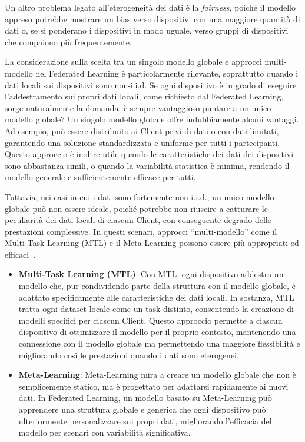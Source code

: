 \documentclass[a4paper, oneside, openright]{report}
\begin{document}
Un altro problema legato all'eterogeneità dei dati è la \textit{fairness}, poiché il modello appreso potrebbe mostrare un bias verso dispositivi con una maggiore quantità di dati o, se si ponderano i dispositivi in modo uguale, verso gruppi di dispositivi che compaiono più frequentemente.

La considerazione sulla scelta tra un singolo modello globale e approcci multi-modello nel Federated Learning è particolarmente rilevante, soprattutto quando i dati locali sui dispositivi sono non-i.i.d. Se ogni dispositivo è in grado di eseguire l'addestramento sui propri dati locali, come richiesto dal Federated Learning, sorge naturalmente la domanda: è sempre vantaggioso puntare a un unico modello globale?
Un singolo modello globale offre indubbiamente alcuni vantaggi. Ad esempio, può essere distribuito ai Client privi di dati o con dati limitati, garantendo una soluzione standardizzata e uniforme per tutti i partecipanti. Questo approccio è inoltre utile quando le caratteristiche dei dati dei dispositivi sono abbastanza simili, o quando la variabilità statistica è minima, rendendo il modello generale e sufficientemente efficace per tutti.

Tuttavia, nei casi in cui i dati sono fortemente non-i.i.d., un unico modello globale può non essere ideale, poiché potrebbe non riuscire a catturare le peculiarità dei dati locali di ciascun Client, con conseguente degrado delle prestazioni complessive. In questi scenari, approcci ``multi-modello'' come il Multi-Task Learning (MTL) e il Meta-Learning possono essere più appropriati ed efficaci~\cite{DBLP:journals/corr/abs-1912-04977}.

\begin{itemize}
\item \textbf{Multi-Task Learning (MTL)}: Con MTL, ogni dispositivo addestra un modello che, pur condividendo parte della struttura con il modello globale, è adattato specificamente alle caratteristiche dei dati locali. In sostanza, MTL tratta ogni dataset locale come un task distinto, consentendo la creazione di modelli specifici per ciascun Client. Questo approccio permette a ciascun dispositivo di ottimizzare il modello per il proprio contesto, mantenendo una connessione con il modello globale ma permettendo una maggiore flessibilità e migliorando così le prestazioni quando i dati sono eterogenei. 
\item \textbf{Meta-Learning}: Meta-Learning mira a creare un modello globale che non è semplicemente statico, ma è progettato per adattarsi rapidamente ai nuovi dati. In Federated Learning, un modello basato su Meta-Learning può apprendere una struttura globale e generica che ogni dispositivo può ulteriormente personalizzare sui propri dati, migliorando l’efficacia del modello per scenari con variabilità significativa.
\end{itemize}
\end{document}
